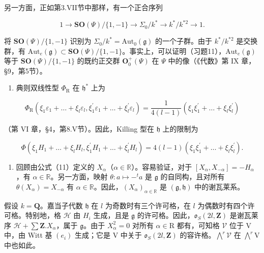 另一方面，正如第3.VII节中那样，有一个正合序列

\[
1 \longrightarrow \mathbf {S O} (\varPsi) / \{1, - 1 \} \longrightarrow \varSigma_ {0} / k ^ {*} \longrightarrow k ^ {*} / k ^ {* 2} \longrightarrow 1.
\]

将 \(\mathbf{SO}(\varPsi)/\{1,-1\}\) 识别为 \(\Sigma_{0}/k^{*}=\mathrm{Aut}_{0}(\mathfrak{g})\) 的一个子群。由于 \(k^{*}/k^{*2}\) 是交换群，有 \(\mathrm{Aut}_{e}(\mathfrak{g})\subset\mathbf{SO}(\varPsi)/\{1,-1\}\)。事实上，可以证明（习题11），\(\mathrm{Aut}_{e}(\mathfrak{g})\) 等于 \(\mathbf{SO}(\varPsi)/\{1,-1\}\) 的既约正交群 \(\mathbf{O}_{0}^{+}(\varPsi)\) 在 \(\varPsi\) 中的像（《代数》第 IX 章，§9，第5节）。

\begin{enumerate}
\def\labelenumi{(\Roman{enumi})}
\setcounter{enumi}{7}
\tightlist
\item
典则双线性型 \(\varPhi_{\mathrm{R}}\) 在 \(\mathfrak{h}^*\) 上为
\end{enumerate}

\[
\Phi_ {\mathrm{R}} \left(\xi_ {1} \varepsilon_ {1} + \dots + \xi_ {l} \varepsilon_ {l}, \xi_ {1} ^ {\prime} \varepsilon_ {1} + \dots + \xi_ {l} ^ {\prime} \varepsilon_ {l}\right) = \frac {1}{4 (l - 1)} \left(\xi_ {1} \xi_ {1} ^ {\prime} + \dots + \xi_ {l} \xi_ {l} ^ {\prime}\right)
\]

（第 VI 章，§4，第8.V节）。因此，Killing 型在 \(\mathfrak{h}\) 上的限制为

\[
\Phi \left(\xi_ {1} H _ {1} + \dots + \xi_ {l} H _ {l}, \xi_ {1} ^ {\prime} H _ {1} + \dots + \xi_ {l} ^ {\prime} H _ {l}\right) = 4 (l - 1) \left(\xi_ {1} \xi_ {1} ^ {\prime} + \dots + \xi_ {l} \xi_ {l} ^ {\prime}\right).
\]

\begin{enumerate}
\def\labelenumi{(\Roman{enumi})}
\setcounter{enumi}{8}
\tightlist
\item
回顾由公式（11）定义的 \(X_{\alpha}\)（\(\alpha \in \mathbb{R}\)）。容易验证，对于 \([X_{\alpha}, X_{-\alpha}] = -H_{\alpha}\)，有 \(\alpha \in \mathbb{R}\)。另一方面，映射 \(\theta : a \mapsto -^{t}a\) 是 \(\mathfrak{g}\) 的自同构，且对所有 \(\theta(X_{\alpha}) = X_{-\alpha}\) 有 \(\alpha \in \mathbb{R}\)。因此，\((X_{\alpha})_{\alpha \in \mathbb{R}}\) 是 \((\mathfrak{g}, \mathfrak{h})\) 中的谢瓦莱系。
\end{enumerate}

假设 \(k = \mathbf{Q}\)。嘉当子代数 \(\mathfrak{h}\) 在 \(l\) 为奇数时有三个许可格，在 \(l\) 为偶数时有四个许可格。特别地，格 \(\mathcal{H}\) 由 \(H_i\) 生成，且是 \(\mathfrak{g}\) 的许可格。因此，\(\mathfrak{o}_S(2l,\mathbf{Z})\) 是谢瓦莱序 \(\mathcal{H} + \sum \mathbf{Z}.X_\alpha\)，属于 \(\mathfrak{g}\)。由于 \(X_{\alpha}^{2} = 0\) 对所有 \(\alpha \in \mathrm{R}\) 都有，可知格 \(\mathcal{V}\) 位于 \(\mathrm{V}\) 中，由 Witt 基 \((e_i)\) 生成；它是 \(\mathrm{V}\) 中关于 \(\mathfrak{o}_S(2l,\mathbf{Z})\) 的容许格。\(\bigwedge^r\mathcal{V}\) 在 \(\bigwedge^r\mathrm{V}\) 中也如此。

